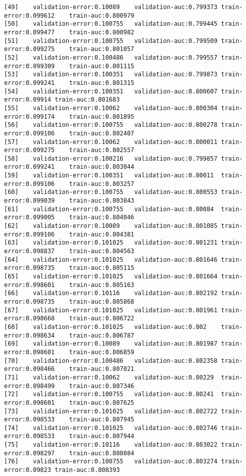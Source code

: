 \documentclass[11pt]{article}
\begin{document}
\begin{Verbatim}[commandchars=\\\{\}]
[49]	validation-error:0.10089	validation-auc:0.799373	train-error:0.099612	train-auc:0.800979
[50]	validation-error:0.100755	validation-auc:0.799445	train-error:0.099477	train-auc:0.800982
[51]	validation-error:0.100755	validation-auc:0.799509	train-error:0.099275	train-auc:0.801057
[52]	validation-error:0.100486	validation-auc:0.799557	train-error:0.099309	train-auc:0.801115
[53]	validation-error:0.100351	validation-auc:0.799873	train-error:0.099241	train-auc:0.801315
[54]	validation-error:0.100351	validation-auc:0.800607	train-error:0.09914	train-auc:0.801683
[55]	validation-error:0.10062	validation-auc:0.800304	train-error:0.099174	train-auc:0.801895
[56]	validation-error:0.100755	validation-auc:0.800278	train-error:0.099106	train-auc:0.802407
[57]	validation-error:0.10062	validation-auc:0.800011	train-error:0.099275	train-auc:0.802557
[58]	validation-error:0.100216	validation-auc:0.799857	train-error:0.099241	train-auc:0.803044
[59]	validation-error:0.100351	validation-auc:0.80011	train-error:0.099106	train-auc:0.803257
[60]	validation-error:0.100755	validation-auc:0.800553	train-error:0.099039	train-auc:0.803843
[61]	validation-error:0.100755	validation-auc:0.80084	train-error:0.099005	train-auc:0.804046
[62]	validation-error:0.10089	validation-auc:0.801085	train-error:0.099106	train-auc:0.804381
[63]	validation-error:0.101025	validation-auc:0.801231	train-error:0.098837	train-auc:0.804563
[64]	validation-error:0.101025	validation-auc:0.801646	train-error:0.098735	train-auc:0.805115
[65]	validation-error:0.101025	validation-auc:0.801664	train-error:0.098601	train-auc:0.805163
[66]	validation-error:0.10116	validation-auc:0.802192	train-error:0.098735	train-auc:0.805868
[67]	validation-error:0.101025	validation-auc:0.801961	train-error:0.098668	train-auc:0.806722
[68]	validation-error:0.101025	validation-auc:0.802	train-error:0.098634	train-auc:0.806787
[69]	validation-error:0.10089	validation-auc:0.801987	train-error:0.098601	train-auc:0.806859
[70]	validation-error:0.100486	validation-auc:0.802358	train-error:0.098466	train-auc:0.807021
[71]	validation-error:0.10062	validation-auc:0.80229	train-error:0.098499	train-auc:0.807346
[72]	validation-error:0.100755	validation-auc:0.80241	train-error:0.098601	train-auc:0.807625
[73]	validation-error:0.101025	validation-auc:0.802722	train-error:0.098533	train-auc:0.807945
[74]	validation-error:0.101025	validation-auc:0.802746	train-error:0.098533	train-auc:0.807944
[75]	validation-error:0.10116	validation-auc:0.803022	train-error:0.098297	train-auc:0.808084
[76]	validation-error:0.100755	validation-auc:0.803274	train-error:0.09823	train-auc:0.808393

\end{Verbatim}
\end{document}
